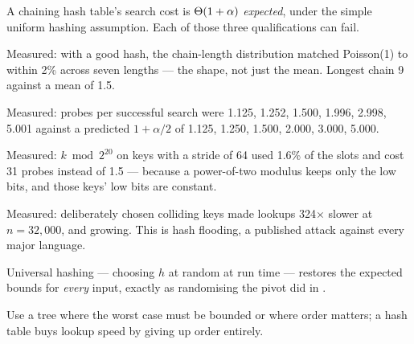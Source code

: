 \begin{chaptersummary}
\begin{tight}
  \item A chaining hash table's search cost is $\Theta(1+\alpha)$
        \emph{expected}, under the simple uniform hashing assumption. Each of
        those three qualifications can fail.
  \item Measured: with a good hash, the chain-length distribution matched
        Poisson(1) to within 2\% across seven lengths --- the shape, not just
        the mean. Longest chain 9 against a mean of 1.5.
  \item Measured: probes per successful search were 1.125, 1.252, 1.500,
        1.996, 2.998, 5.001 against a predicted $1+\alpha/2$ of 1.125, 1.250,
        1.500, 2.000, 3.000, 5.000.
  \item Measured: $k \bmod 2^{20}$ on keys with a stride of 64 used 1.6\% of the
        slots and cost 31 probes instead of 1.5 --- because a power-of-two
        modulus keeps only the low bits, and those keys' low bits are constant.
  \item Measured: deliberately chosen colliding keys made lookups 324$\times$
        slower at $n = 32{,}000$, and growing. This is hash flooding, a
        published attack against every major language.
  \item Universal hashing --- choosing $h$ at random at run time --- restores
        the expected bounds for \emph{every} input, exactly as randomising the
        pivot did in .
  \item Use a tree where the worst case must be bounded or where order
        matters; a hash table buys lookup speed by giving up order entirely.
\end{tight}
\end{chaptersummary}

